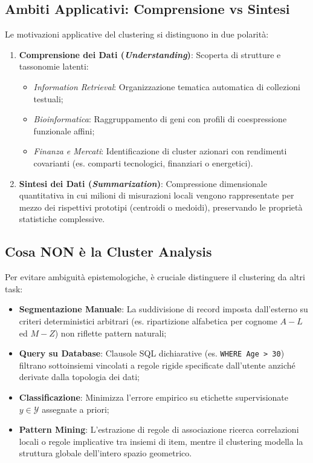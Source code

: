 \subsection{Ambiti Applicativi: Comprensione vs Sintesi}
Le motivazioni applicative del clustering si distinguono in due polarità:
\begin{enumerate}
    \item \textbf{Comprensione dei Dati (\textit{Understanding})}: Scoperta di strutture e tassonomie latenti:
    \begin{itemize}[noitemsep]
        \item \textit{Information Retrieval}: Organizzazione tematica automatica di collezioni testuali;
        \item \textit{Bioinformatica}: Raggruppamento di geni con profili di coespressione funzionale affini;
        \item \textit{Finanza e Mercati}: Identificazione di cluster azionari con rendimenti covarianti (es. comparti tecnologici, finanziari o energetici).
    \end{itemize}
    \item \textbf{Sintesi dei Dati (\textit{Summarization})}: Compressione dimensionale quantitativa in cui milioni di misurazioni locali vengono rappresentate per mezzo dei rispettivi prototipi (centroidi o medoidi), preservando le proprietà statistiche complessive.
\end{enumerate}

\FloatBarrier
\subsection{Cosa NON è la Cluster Analysis}
Per evitare ambiguità epistemologiche, è cruciale distinguere il clustering da altri task:
\begin{itemize}
    \item \textbf{Segmentazione Manuale}: La suddivisione di record imposta dall'esterno su criteri deterministici arbitrari (es. ripartizione alfabetica per cognome $A-L$ ed $M-Z$) non riflette pattern naturali;
    \item \textbf{Query su Database}: Clausole SQL dichiarative (es. \texttt{WHERE Age > 30}) filtrano sottoinsiemi vincolati a regole rigide specificate dall'utente anziché derivate dalla topologia dei dati;
    \item \textbf{Classificazione}: Minimizza l'errore empirico su etichette supervisionate $y \in \mathcal{Y}$ assegnate a priori;
    \item \textbf{Pattern Mining}: L'estrazione di regole di associazione ricerca correlazioni locali o regole implicative tra insiemi di item, mentre il clustering modella la struttura globale dell'intero spazio geometrico.
\end{itemize}

